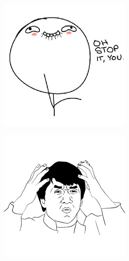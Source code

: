 \begin{multicols}{8}
\begin{center}
\includegraphics[width=\linewidth]{./IMG-GIT/MEMES/Meme-Faces-17.jpg}  
\end{center}

\begin{center}
\includegraphics[width=\linewidth]{./IMG-GIT/MEMES/Meme-Faces-26.jpg}  
\end{center}


\end{multicols}
